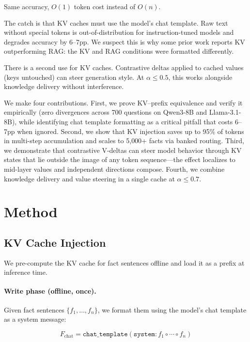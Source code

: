 \documentclass{article}
\begin{document}
Same accuracy, $O(1)$ token cost instead of $O(n)$.

The catch is that KV caches must use the model's chat template. Raw text without special tokens is out-of-distribution for instruction-tuned models and degrades accuracy by 6--7pp. We suspect this is why some prior work reports KV outperforming RAG: the KV and RAG conditions were formatted differently.

There is a second use for KV caches. Contrastive deltas applied to cached values (keys untouched) can steer generation style. At $\alpha{\leq}0.5$, this works alongside knowledge delivery without interference.

We make four contributions. First, we prove KV--prefix equivalence and verify it empirically (zero divergences across 700 questions on Qwen3-8B and Llama-3.1-8B), while identifying chat template formatting as a critical pitfall that costs 6--7pp when ignored. Second, we show that KV injection saves up to 95\% of tokens in multi-step accumulation and scales to 5{,}000+ facts via banked routing. Third, we demonstrate that contrastive V-deltas can steer model behavior through KV states that lie outside the image of any token sequence---the effect localizes to mid-layer values and independent directions compose. Fourth, we combine knowledge delivery and value steering in a single cache at $\alpha{\leq}0.7$.

\section{Method}

\subsection{KV Cache Injection}

We pre-compute the KV cache for fact sentences offline and load it as a prefix at inference time.

\paragraph{Write phase (offline, once).} Given fact sentences $\{f_1, \ldots, f_n\}$, we format them using the model's chat template as a system message:

\begin{equation}
    F_{\text{chat}} = \texttt{chat\_template}(\texttt{system}: f_1 \circ \cdots \circ f_n)
\end{equation}
\end{document}
